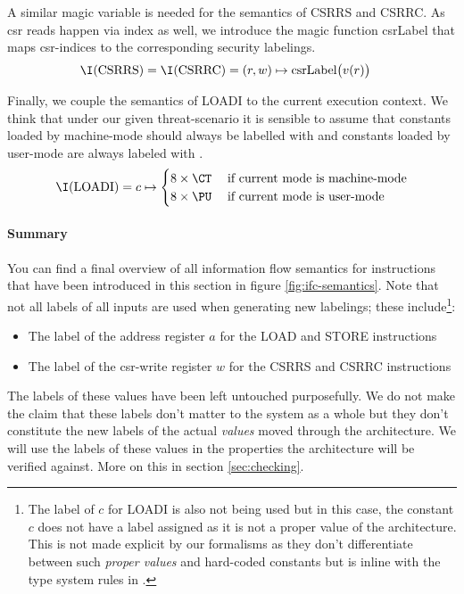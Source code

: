 A similar magic variable is needed for the semantics of CSRRS and CSRRC.
As \gls{csr} reads happen via index as well, we introduce the magic function csrLabel that maps \gls{csr}-indices to the corresponding security labelings.
\begin{align*}
    \I(\text{CSRRS}) = \I(\text{CSRRC}) &= (r, w) \mapsto \text{csrLabel}\big(v(r) \big)
\end{align*}

Finally, we couple the semantics of LOADI to the current execution context.
We think that under our given threat-scenario it is sensible to assume that constants loaded by machine-mode should always be labelled with \CT{} and constants loaded by user-mode are always labeled with \PU{}.
\begin{equation*}
    \I(\text{LOADI}) = c \mapsto \begin{cases}
        8 \times \CT & \; \text{if current mode is machine-mode} \\
        8 \times \PU & \; \text{if current mode is user-mode}
    \end{cases}
\end{equation*}


\paragraph{Summary}
You can find a final overview of all information flow semantics for instructions that have been introduced in this section in figure \ref{fig:ifc-semantics}.
Note that not all labels of all inputs are used when generating new labelings; these include\footnote{%
    The label of $ c $ for LOADI is also not being used but in this case, the constant $ c $ does not have a label assigned as it is not a proper value of the architecture.
    This is not made explicit by our formalisms as they don't differentiate between such \textit{proper values} and hard-coded constants but is inline with the type system rules in \cite{Ferraiuolo17}.
}:
\begin{itemize}
    \item The label of the address register $ a $ for the LOAD and STORE instructions
    \item The label of the \gls{csr}-write register $ w $ for the CSRRS and CSRRC instructions
\end{itemize}

The labels of these values have been left untouched purposefully.
We do not make the claim that these labels don't matter to the system as a whole but they don't constitute the new labels of the actual \textit{values} moved through the architecture.
We will use the labels of these values in the properties the architecture will be verified against.
More on this in section \ref{sec:checking}.

